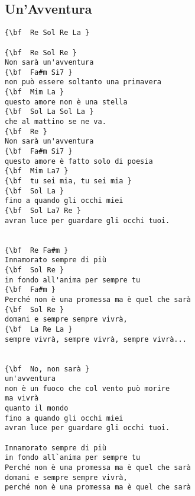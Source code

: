 \documentclass[a4paper]{article}
\begin{document}
\subsection{Un'Avventura}
\begin{multicols}{2}\begin{Verbatim}[commandchars=\\\{\}]
{\bf  Re Sol Re La }

{\bf  Re Sol Re }
Non sarà un'avventura 
{\bf  Fa#m Si7 }
non può essere soltanto una primavera 
{\bf  Mim La }
questo amore non è una stella 
{\bf  Sol La Sol La }
che al mattino se ne va. 
{\bf  Re }
Non sarà un'avventura 
{\bf  Fa#m Si7 }
questo amore è fatto solo di poesia 
{\bf  Mim La7 }
{\bf  tu sei mia, tu sei mia }
{\bf  Sol La }
fino a quando gli occhi miei 
{\bf  Sol La7 Re }
avran luce per guardare gli occhi tuoi. 


{\bf  Re Fa#m }
Innamorato sempre di più 
{\bf  Sol Re }
in fondo all'anima per sempre tu 
{\bf  Fa#m }
Perché non è una promessa ma è quel che sarà 
{\bf  Sol Re }
domani e sempre sempre vivrà, 
{\bf  La Re La }
sempre vivrà, sempre vivrà, sempre vivrà... 


{\bf  No, non sarà }
un'avventura 
non è un fuoco che col vento può morire 
ma vivrà 
quanto il mondo 
fino a quando gli occhi miei 
avran luce per guardare gli occhi tuoi. 

Innamorato sempre di più 
in fondo all`anima per sempre tu 
Perché non è una promessa ma è quel che sarà 
domani e sempre sempre vivrà, 
perché non è una promessa ma è quel che sarà

\end{Verbatim}
\end{multicols}\newpage
\end{document}
